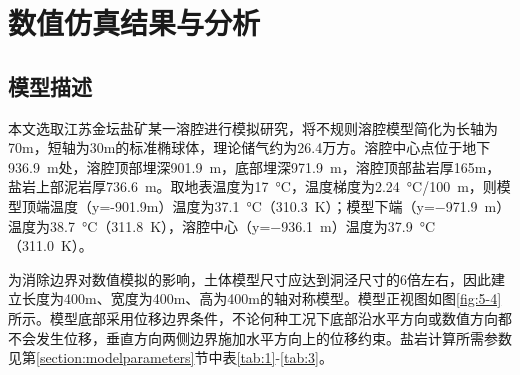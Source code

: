 \chapter{数值仿真结果与分析}


\section{模型描述}

本文选取江苏金坛盐矿某一溶腔进行模拟研究，将不规则溶腔模型简化为长轴为70m，短轴为30m的标准椭球体，理论储气约为26.4万方。溶腔中心点位于地下\SI{936.9}{m}处，溶腔顶部埋深\SI{901.9}{m}，底部埋深\SI{971.9}{m}，溶腔顶部盐岩厚165m，盐岩上部泥岩厚\SI{736.6}{m}。取地表温度为\SI{17}{ \degreeCelsius}，温度梯度为\SI{2.24}{\degreeCelsius}/\SI{100}{m}，则模型顶端温度（y=-901.9m）温度为\SI{37.1}{\degreeCelsius}（\SI{310.3}{K}）；模型下端（y=\SI{-971.9}{m}）温度为\SI{38.7}{\degreeCelsius}（\SI{311.8}{K}），溶腔中心（y=\SI{-936.1}{m}）温度为\SI{37.9}{\degreeCelsius}（\SI{311.0}{K}）。

为消除边界对数值模拟的影响，土体模型尺寸应达到洞泾尺寸的\num{6}倍左右，因此建立长度为400m、宽度为400m、高为400m的轴对称模型。模型正视图如图\ref{fig:5-4}所示。模型底部采用位移边界条件，不论何种工况下底部沿水平方向或数值方向都不会发生位移，垂直方向两侧边界施加水平方向上的位移约束。盐岩计算所需参数见第\ref{section:modelparameters}节中表\ref{tab:1}-\ref{tab:3}。

